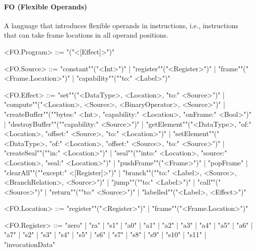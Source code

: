 \documentclass[main.tex]{subfiles}
\begin{document}
\paragraph{ FO (Flexible Operands) } A language that introduces flexible operands in instructions, i.e., instructions that can take frame locations in all operand positions.
\begin{grammar}
	\footnotesize
				<FO.Program> ::=
							"("<[Effect]>")"
				\par
				<FO.Source> ::=
						"constant""("<Int>")"
						| "register""("<Register>")"
						| "frame""("<Frame.Location>")"
						| "capability""(""to:" <Label>")"
				\par
				<FO.Effect> ::=
						"set""("<DataType>, <Location>, "to:" <Source>")"
						| "compute""("<Location>, <Source>, <BinaryOperator>, <Source>")"
						| "createBuffer""(""bytes:" <Int>, "capability:" <Location>, "onFrame:" <Bool>")"
						| "destroyBuffer""(""capability:" <Source>")"
						| "getElement""("<DataType>, "of:" <Location>, "offset:" <Source>, "to:" <Location>")"
						| "setElement""("<DataType>, "of:" <Location>, "offset:" <Source>, "to:" <Source>")"
						| "createSeal""(""in:" <Location>")"
						| "seal""(""into:" <Location>, "source:" <Location>, "seal:" <Location>")"
						| "pushFrame""("<Frame>")"
						| "popFrame"
						| "clearAll""(""except:" <[Register]>")"
						| "branch""(""to:" <Label>, <Source>, <BranchRelation>, <Source>")"
						| "jump""(""to:" <Label>")"
						| "call""("<Source>")"
						| "return""(""to:" <Source>")"
						| "labelled""("<Label>, <Effect>")"
				\par
				<FO.Location> ::=
						"register""("<Register>")"
						| "frame""("<Frame.Location>")"
				\par
				<FO.Register> ::=
						"zero"
						| "ra"
						| "s1"
						| "a0"
						| "a1"
						| "a2"
						| "a3"
						| "a4"
						| "a5"
						| "a6"
						| "a7"
						| "s2"
						| "s3"
						| "s4"
						| "s5"
						| "s6"
						| "s7"
						| "s8"
						| "s9"
						| "s10"
						| "s11"
						| "invocationData"
				\par
\end{grammar}
\par
\end{document}

